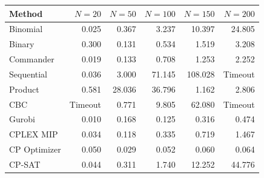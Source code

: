 \begin{tabular}{@{}lrrrrr@{}}
\toprule
Method & $N=20$ & $N=50$ & $N=100$ & $N=150$ & $N=200$ \\ \midrule
Binomial & 0.025 & 0.367 & 3.237 & 10.397 & 24.805 \\
Binary & 0.300 & 0.131 & 0.534 & 1.519 & 3.208 \\
Commander & 0.019 & 0.133 & 0.708 & 1.253 & 2.252 \\
Sequential & 0.036 & 3.000 & 71.145 & 108.028 & Timeout \\
Product & 0.581 & 28.036 & 36.796 & 1.162 & 2.806 \\
CBC & Timeout & 0.771 & 9.805 & 62.080 & Timeout \\
Gurobi & 0.010 & 0.168 & 0.125 & 0.316 & 0.474 \\
CPLEX MIP & 0.034 & 0.118 & 0.335 & 0.719 & 1.467 \\
CP Optimizer & 0.050 & 0.029 & 0.052 & 0.060 & 0.064 \\
CP-SAT & 0.044 & 0.311 & 1.740 & 12.252 & 44.776 \\
\bottomrule
\end{tabular}
